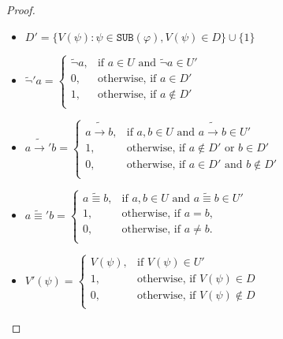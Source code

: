 \documentclass{article}
\theoremstyle{definition}
\theoremstyle{definition}
\theoremstyle{definition}
\newcommand*{\id}{\equiv}
\newcommand*{\ra}{\rightarrow}
\newcommand*{\SUB}{\texttt{SUB}}
\begin{document}
\begin{proof}
\begin{itemize}
        \item $D' = \{V(\psi) : \psi \in \SUB(\varphi), V(\psi) \in D\} \cup \{1\}$
        \item $
                  \tilde{\lnot}'a = \begin{cases}
                      \tilde{\lnot}a , & \text{if } a \in U \text{ and } \tilde{\lnot}a \in U' \\
                      0,               & \text{otherwise, if } a \in D'                        \\
                      1,               & \text{otherwise, if } a \not \in D'                   \\
                  \end{cases}
              $
        \item $
                  a\tilde{\ra}'b = \begin{cases}
                      a\tilde{\ra}b , & \text{if } a, b \in U \text{ and } a \tilde{\ra} b \in U' \\
                      1,              & \text{otherwise, if } a \not \in D' \text{ or } b \in D'  \\
                      0,              & \text{otherwise, if } a \in D' \text{ and } b \not \in D' \\
                  \end{cases}
              $
        \item $
                  a\tilde{\id}'b = \begin{cases}
                      a\tilde{\id}b , & \text{if } a,b \in U \text{ and } a \tilde{\id} b \in U' \\
                      1,              & \text{otherwise, if } a = b,                             \\
                      0,              & \text{otherwise, if }a \not = b.                         \\
                  \end{cases}
              $
        \item $V'(\psi) = \begin{cases}
                      V(\psi) , & \text{if } V(\psi) \in U'                \\
                      1,        & \text{otherwise, if } V(\psi) \in D      \\
                      0,        & \text{otherwise, if } V(\psi) \not \in D \\
                  \end{cases}$

\end{itemize}
\end{proof}
\end{document}
